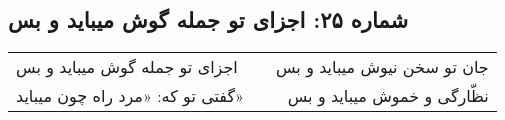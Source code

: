 \begin{center}
\section*{شماره ۲۵: اجزای تو جمله گوش میباید و بس}
\label{sec:025}
\begin{longtable}{l p{0.5cm} r}
اجزای تو جمله گوش میباید و بس
&&
جان تو سخن نیوش میباید و بس
\\
گفتی تو که: «مرد راه چون میباید»
&&
نظّارگی و خموش میباید و بس
\\
\end{longtable}
\end{center}
